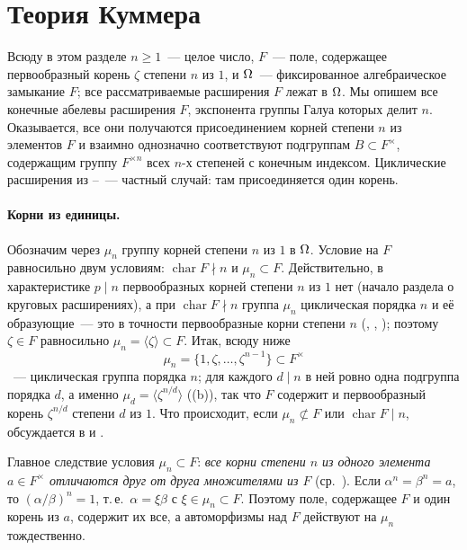 \makeatletter
{}
\makeatother
\section{Теория Куммера}

Всюду в этом разделе $n\ge1$~--- целое число, $F$~--- поле, содержащее первообразный корень $\zeta$ степени $n$ из $1$, и
$\Omega$~--- фиксированное алгебраическое замыкание $F$; все рассматриваемые расширения $F$ лежат в $\Omega$. Мы опишем все
конечные абелевы расширения $F$, экспонента группы Галуа которых делит $n$. Оказывается, все они получаются присоединением
корней степени $n$ из элементов $F$ и взаимно однозначно соответствуют подгруппам $B\subset F^\times$, содержащим группу
$F^{\times n}$ всех $n$-х степеней с конечным индексом. Циклические расширения из --~--- частный случай: там
присоединяется один корень.

\paragraph{Корни из единицы.} Обозначим через $\mu_n$ группу корней степени $n$ из $1$ в $\Omega$. Условие на $F$ равносильно
двум условиям: $\operatorname{char}F\nmid n$ и $\mu_n\subset F$. Действительно, в характеристике $p\mid n$ первообразных
корней степени $n$ из $1$ нет (начало раздела о круговых расширениях), а при $\operatorname{char}F\nmid n$ группа $\mu_n$
циклическая порядка $n$ и её образующие~--- это в точности первообразные корни степени $n$ (, , ); поэтому
$\zeta\in F$ равносильно $\mu_n=\langle\zeta\rangle\subset F$. Итак, всюду ниже
\[
\mu_n=\{1,\zeta,\dots,\zeta^{n-1}\}\subset F^\times
\]
~--- циклическая группа порядка $n$; для каждого $d\mid n$ в ней ровно одна подгруппа порядка $d$, а именно
$\mu_d=\langle\zeta^{n/d}\rangle$ ((b)), так что $F$ содержит и первообразный корень $\zeta^{n/d}$ степени $d$ из
$1$. Что происходит, если $\mu_n\not\subset F$ или $\operatorname{char}F\mid n$, обсуждается в  и .

Главное следствие условия $\mu_n\subset F$: \emph{все корни степени $n$ из одного элемента $a\in F^\times$ отличаются друг
от друга множителями из $F$} (ср.\ ). Если $\alpha^n=\beta^n=a$, то $(\alpha/\beta)^n=1$, т.\,е.\ $\alpha=\xi\beta$ с
$\xi\in\mu_n\subset F$. Поэтому поле, содержащее $F$ и один корень из $a$, содержит их все, а автоморфизмы над $F$
действуют на $\mu_n$ тождественно.

